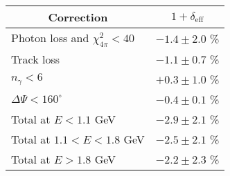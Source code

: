 \begin{tabular}{lc}
\multicolumn{1}{c}{Correction} & $1 + \delta_\text{eff}$ \\ \hline
Photon loss and \( \chi^2_{4\pi} < 40 \) & $ -1.4 \pm 2.0 $ \% \\
Track loss & $ -1.1 \pm 0.7 $ \% \\
\( n_\gamma < 6 \) & $ +0.3 \pm 1.0 $ \% \\
\( \Delta\Psi < 160^\circ \) & $ -0.4 \pm 0.1 $ \% \\
\hline
Total at $E < 1.1$ GeV & $ -2.9 \pm 2.1 $ \% \\
Total at $1.1 < E < 1.8$ GeV & $ -2.5 \pm 2.1 $ \% \\
Total at $E > 1.8$ GeV & $ -2.2 \pm 2.3 $ \% \\
\end{tabular}

